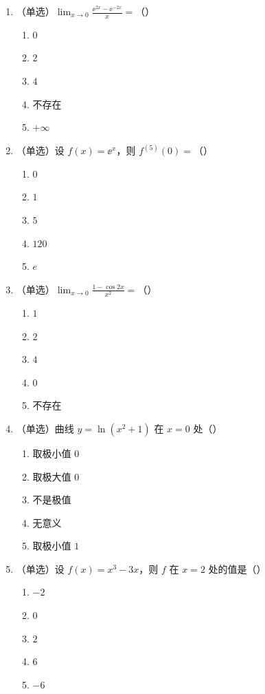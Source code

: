 \begin{enumerate}[label=\textbf{A\arabic*.}]
  \item （单选）$\displaystyle\lim_{x\to0}\frac{\ee^{2x}-\ee^{-2x}}{x}=$（\quad）
    \begin{enumerate}[label=(\Alph*),nosep]
    \item $0$ \item $2$ \item $4$ \item 不存在 \item $+\infty$
    \end{enumerate}
  \item （单选）设 $f(x)=\ee^{x}$，则 $f^{(5)}(0)=$（\quad）
    \begin{enumerate}[label=(\Alph*),nosep]
    \item $0$ \item $1$ \item $5$ \item $120$ \item $e$
    \end{enumerate}
  \item （单选）$\displaystyle\lim_{x\to0}\frac{1-\cos 2x}{x^{2}}=$（\quad）
    \begin{enumerate}[label=(\Alph*),nosep]
    \item $1$ \item $2$ \item $4$ \item $0$ \item 不存在
    \end{enumerate}
  \item （单选）曲线 $y=\ln(x^{2}+1)$ 在 $x=0$ 处（\quad）
    \begin{enumerate}[label=(\Alph*),nosep]
    \item 取极小值 $0$ \item 取极大值 $0$ \item 不是极值 \item 无意义 \item 取极小值 $1$
    \end{enumerate}
  \item （单选）设 $f(x)=x^{3}-3x$，则 $f$ 在 $x=2$ 处的值是（\quad）
    \begin{enumerate}[label=(\Alph*),nosep]
    \item $-2$ \item $0$ \item $2$ \item $6$ \item $-6$

\end{enumerate}
\end{enumerate}
